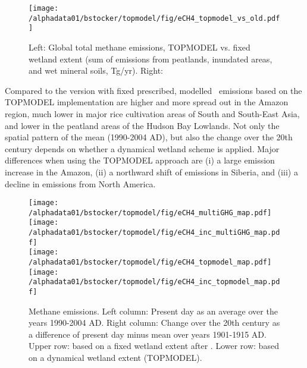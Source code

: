 \begin{figure}[ht!]
\begin{center}
  \texttt{[image: /alphadata01/bstocker/topmodel/fig/eCH4\_topmodel\_vs\_old.pdf]}
\end{center}
\caption{Left: Global total methane emissions, TOPMODEL vs. fixed wetland extent \citep{prigent07grl} (sum of emissions from peatlands, inundated areas, and wet mineral soils, Tg\chh /yr). Right:
}
\label{fig:ch4glob}
\end{figure}

Compared to the version with fixed prescribed, modelled \chh\ emissions based on the TOPMODEL implementation are higher and more spread out in the Amazon region, much lower in major rice cultivation areas of South and South-East Asia, and lower in the peatland areas of the Hudson Bay Lowlands. Not only the spatial pattern of the mean (1990-2004 AD), but also the change over the 20th century depends on whether a dynamical wetland scheme is applied. Major differences when using the TOPMODEL approach are (i) a large emission increase in the Amazon, (ii) a northward shift of emissions in Siberia, and (iii) a decline in emissions from North America. 

\begin{figure}[ht!]
\begin{center}
  \texttt{[image: /alphadata01/bstocker/topmodel/fig/eCH4\_multiGHG\_map.pdf]}
  \texttt{[image: /alphadata01/bstocker/topmodel/fig/eCH4\_inc\_multiGHG\_map.pdf]}\\
  \texttt{[image: /alphadata01/bstocker/topmodel/fig/eCH4\_topmodel\_map.pdf]}
  \texttt{[image: /alphadata01/bstocker/topmodel/fig/eCH4\_inc\_topmodel\_map.pdf]}
\end{center}
\caption{Methane emissions. Left column: Present day as an average over the years 1990-2004 AD. Right column: Change over the 20th century as a difference of present day minus mean over years 1901-1915 AD. Upper row: based on a fixed wetland extent after \citet{prigent07grl}. Lower row: based on a dynamical wetland extent (TOPMODEL).}
\label{fig:ptcrit}
\end{figure}

